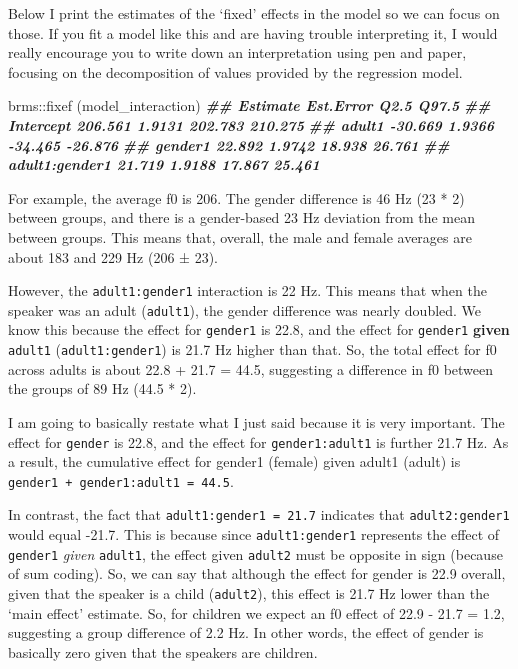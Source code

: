 \documentclass[
]{book}
\newenvironment{Shaded}{\begin{snugshade}}{\end{snugshade}}
\newcommand{\DocumentationTok}[1]{\textcolor[rgb]{0.56,0.35,0.01}{\textbf{\textit{#1}}}}
\newcommand{\FunctionTok}[1]{\textcolor[rgb]{0.00,0.00,0.00}{#1}}
\newcommand{\NormalTok}[1]{#1}
\newcommand{\SpecialCharTok}[1]{\textcolor[rgb]{0.00,0.00,0.00}{#1}}
\begin{document}
Below I print the estimates of the `fixed' effects in the model so we can focus on those. If you fit a model like this and are having trouble interpreting it, I would really encourage you to write down an interpretation using pen and paper, focusing on the decomposition of values provided by the regression model.

\begin{Shaded}
\begin{Highlighting}[]
\NormalTok{brms}\SpecialCharTok{::}\FunctionTok{fixef}\NormalTok{ (model\_interaction)}
\DocumentationTok{\#\#                Estimate Est.Error    Q2.5   Q97.5}
\DocumentationTok{\#\# Intercept       206.561    1.9131 202.783 210.275}
\DocumentationTok{\#\# adult1          {-}30.669    1.9366 {-}34.465 {-}26.876}
\DocumentationTok{\#\# gender1          22.892    1.9742  18.938  26.761}
\DocumentationTok{\#\# adult1:gender1   21.719    1.9188  17.867  25.461}
\end{Highlighting}
\end{Shaded}

For example, the average f0 is 206. The gender difference is 46 Hz (23 * 2) between groups, and there is a gender-based 23 Hz deviation from the mean between groups. This means that, overall, the male and female averages are about 183 and 229 Hz (206 ± 23).

However, the \texttt{adult1:gender1} interaction is 22 Hz. This means that when the speaker was an adult (\texttt{adult1}), the gender difference was nearly doubled. We know this because the effect for \texttt{gender1} is 22.8, and the effect for \texttt{gender1} \textbf{given} \texttt{adult1} (\texttt{adult1:gender1}) is 21.7 Hz higher than that. So, the total effect for f0 across adults is about 22.8 + 21.7 = 44.5, suggesting a difference in f0 between the groups of 89 Hz (44.5 * 2).

I am going to basically restate what I just said because it is very important. The effect for \texttt{gender} is 22.8, and the effect for \texttt{gender1:adult1} is further 21.7 Hz. As a result, the cumulative effect for gender1 (female) given adult1 (adult) is \texttt{gender1\ +\ gender1:adult1\ =\ 44.5}.

In contrast, the fact that \texttt{adult1:gender1\ =\ 21.7} indicates that \texttt{adult2:gender1} would equal -21.7. This is because since \texttt{adult1:gender1} represents the effect of \texttt{gender1} \emph{given} \texttt{adult1}, the effect given \texttt{adult2} must be opposite in sign (because of sum coding). So, we can say that although the effect for gender is 22.9 overall, given that the speaker is a child (\texttt{adult2}), this effect is 21.7 Hz lower than the `main effect' estimate. So, for children we expect an f0 effect of 22.9 - 21.7 = 1.2, suggesting a group difference of 2.2 Hz. In other words, the effect of gender is basically zero given that the speakers are children.
\end{document}
